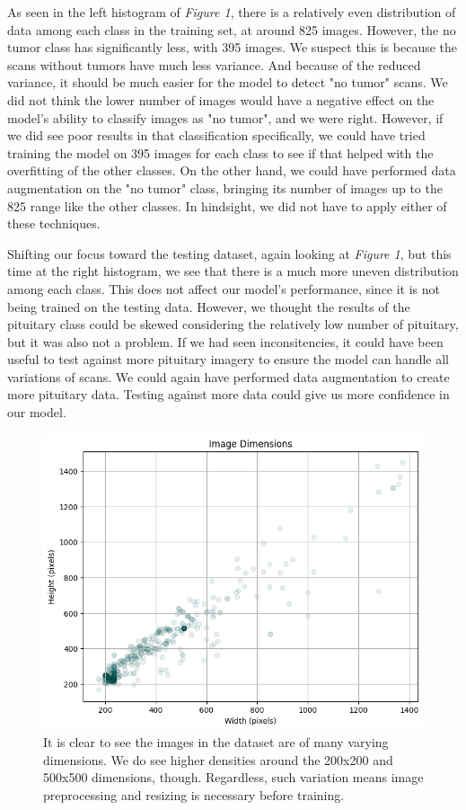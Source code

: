 \documentclass[conference]{IEEEtran}
\begin{document}
As seen in the left histogram of \textit{Figure 1}, there is a relatively even distribution of data among each class in the training set, at around 825 images. However, the no tumor class has significantly less, with 395 images. We suspect this is because the scans without tumors have much less variance. And because of the reduced variance, it should be much easier for the model to detect "no tumor" scans. We did not think the lower number of images would have a negative effect on the model's ability to classify images as "no tumor", and we were right. However, if we did see poor results in that classification specifically, we could have tried training the model on 395 images for each class to see if that helped with the overfitting of the other classes. On the other hand, we could have performed data augmentation on the "no tumor" class, bringing its number of images up to the 825 range like the other classes. In hindsight, we did not have to apply either of these techniques.

Shifting our focus toward the testing dataset, again looking at \textit{Figure 1}, but this time at the right histogram, we see that there is a much more uneven distribution among each class. This does not affect our model's performance, since it is not being trained on the testing data. However, we thought the results of the pituitary class could be skewed considering the relatively low number of pituitary, but it was also not a problem. If we had seen inconsitencies, it could have been useful to test against more pituitary imagery to ensure the model can handle all variations of scans. We could again have performed data augmentation to create more pituitary data. Testing against more data could give us more confidence in our model.

\begin{figure}[!ht]
    \centering
    \includegraphics[width=5in]{ImageDimensions.png}
    \caption{\large It is clear to see the images in the dataset are of many varying dimensions. We do see higher densities around the 200x200 and 500x500 dimensions, though. Regardless, such variation means image preprocessing and resizing is necessary before training.}
    \label{Dimensions of images in the dataset}
\end{figure}
\end{document}
